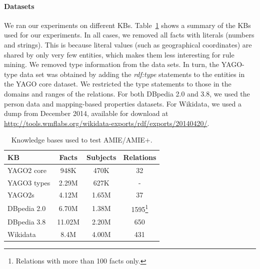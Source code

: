 \paragraph{Datasets} We ran our experiments on different KBs. Table~\ref{kbs} shows a summary of the KBs used for our experiments.
In all cases, we removed all facts with literals (numbers and strings).
This is because literal values (such as geographical coordinates) are shared by only very few entities,
which makes them less interesting for rule mining.
We removed type information from the data sets. In turn, the YAGO-type data set was obtained by adding the \emph{rdf:type} statements to the entities
in the YAGO core dataset. We restricted the type statements to those in the domains and ranges of the relations.
For both DBpedia 2.0 and 3.8, we used the person data and mapping-based properties datasets. 
For Wikidata, we used a dump from December 2014, available for download at \url{http://tools.wmflabs.org/wikidata-exports/rdf/exports/20140420/}.

\begin{savenotes}
\begin{table}
\footnotesize
\begin{tabular}{l|c|c|c}
KB & Facts & Subjects & Relations\\
\hline
YAGO2 core  & 948K & 470K & 32\\
YAGO3 types  & 2.29M & 627K & -\\
YAGO2s & 4.12M  & 1.65M & 37\\
DBpedia 2.0 & 6.70M & 1.38M & 1595\footnote{Relations with more than 100 facts only.} \\
DBpedia 3.8 & 11.02M & 2.20M & 650 \\
Wikidata & 8.4M & 4.00M & 431
\end{tabular}
\caption{Knowledge bases used to test AMIE/AMIE+. }
\label{kbs}
\end{table}
\end{savenotes}

